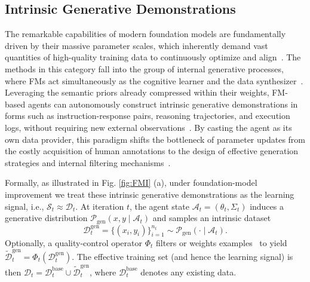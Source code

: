 \subsection{Intrinsic Generative Demonstrations}
\label{sec:Intrinsic_Generative_Demonstrations}
\label{sec:Self_Generated_Data}

The remarkable capabilities of modern foundation models are fundamentally driven by their massive parameter scales, which inherently demand vast quantities of high-quality training data to continuously optimize and align~\citep{zhao2024selfguidebettertaskspecificinstruction, gan2025theoreticalunderstandingsyntheticdata}. The methods in this category fall into the group of internal generative processes, where FMs act simultaneously as the cognitive learner and the data synthesizer~\citep{zhao2024selfguidebettertaskspecificinstruction, zweiger2025selfadapting}. Leveraging the  semantic priors already compressed within their weights, FM-based agents can autonomously construct intrinsic generative demonstrations in forms such as instruction-response pairs, reasoning trajectories, and execution logs, without requiring new external observations~\citep{zhao2024selfguidebettertaskspecificinstruction, shi2025taskcraft, simonds2025ladder}. By casting the agent as its own data provider, this paradigm shifts the bottleneck of parameter updates from the costly acquisition of human annotations to the design of effective generation strategies and internal filtering mechanisms~\citep{qin2025dive}. 

Formally, as illustrated in Fig. \ref{fig:FMI} (a), under foundation-model improvement we treat these intrinsic generative demonstrations as the learning signal, i.e., $\mathcal{S}_t \approx \mathcal{D}_t$. At iteration $t$, the agent state $\mathcal{A}_t=(\theta_t,\Sigma_t)$ induces a generative distribution $\mathcal{P}_{\mathrm{gen}}(x,y \mid \mathcal{A}_t)$ and samples an intrinsic dataset
\begin{equation}
\mathcal{D}^{\mathrm{gen}}_t=\{(x_i,y_i)\}_{i=1}^{n_t}\sim \mathcal{P}_{\mathrm{gen}}(\cdot\mid \mathcal{A}_t).
\end{equation}
Optionally, a quality-control operator $\Phi_t$ filters or weights examples~\citep{jiang2025importance} to yield
$\tilde{\mathcal{D}}^{\mathrm{gen}}_t=\Phi_t(\mathcal{D}^{\mathrm{gen}}_t)$. The effective training set (and hence the learning signal) is then
$\mathcal{D}_t=\mathcal{D}^{\mathrm{base}}_t\cup \tilde{\mathcal{D}}^{\mathrm{gen}}_t$,
where $\mathcal{D}^{\mathrm{base}}_t$ denotes any existing data.


